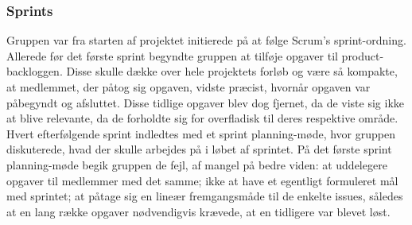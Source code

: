 \subsubsection{Sprints}
Gruppen var fra starten af projektet initierede på at følge Scrum's sprint-ordning. Allerede før det første sprint begyndte gruppen at tilføje opgaver til product-backloggen. Disse skulle dække over hele projektets forløb og være så kompakte, at medlemmet, der påtog sig opgaven, vidste præcist, hvornår opgaven var påbegyndt og afsluttet. Disse tidlige opgaver blev dog fjernet, da de viste sig ikke at blive relevante, da de forholdte sig for overfladisk til deres respektive område. Hvert efterfølgende sprint indledtes med et sprint planning-møde, hvor gruppen diskuterede, hvad der skulle arbejdes på i løbet af sprintet. På det første sprint planning-møde begik gruppen de fejl, af mangel på bedre viden: at uddelegere opgaver til medlemmer med det samme; ikke at have et egentligt formuleret mål med sprintet; at påtage sig en lineær fremgangsmåde til de enkelte issues, således at en lang række opgaver nødvendigvis krævede, at en tidligere var blevet løst.

